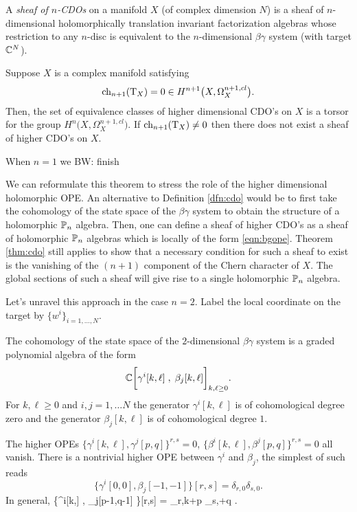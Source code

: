 \documentclass[11pt]{amsart}
\def\brian#1{{\textcolor{blue!65!red}{BW: {#1}}}}
\begin{document}
\begin{dfn}\label{dfn:cdo}
A {\em sheaf of $n$-CDOs} on a manifold $X$ (of complex dimension $N$) is a sheaf of $n$-dimensional holomorphically translation invariant factorization algebras whose restriction to any $n$-disc is equivalent to the $n$-dimensional $\beta\gamma$ system (with target $\mathbb C^N$). 
\end{dfn}

\begin{thm}\label{thm:cdo}
Suppose $X$ is a complex manifold satisfying 
\[
{\rm ch}_{n+1} ({\rm T}_X) = 0 \in H^{n+1} \big(X , \Omega^{n+1,cl}_X\big).
\]
Then, the set of equivalence classes of higher dimensional CDO's on $X$ is a torsor for the group $H^n \big(X , \Omega^{n+1, cl}_X\big)$. 
If ${\rm ch}_{n+1}({\rm T}_X) \ne 0$ then there does not exist a sheaf of higher CDO's on $X$. 
\end{thm}

\begin{rmk}
When $n=1$ we \cite{GGW} \brian{finish}
\end{rmk} 

We can reformulate this theorem to stress the role of the higher dimensional holomorphic OPE. 
An alternative to Definition \ref{dfn:cdo} would be to first take the cohomology of the state space of the $\beta\gamma$ system to obtain the structure of a holomorphic $\mathbb P_n$ algebra.
Then, one can define a sheaf of higher CDO's as a sheaf of holomorphic $\mathbb P_n$ algebras which is locally of the form \eqref{eqn:bgope}. 
Theorem \ref{thm:cdo} still applies to show that a necessary condition for such a sheaf to exist is the vanishing of the $(n+1)$ component of the Chern character of $X$. 
The global sections of such a sheaf will give rise to a single holomorphic $\mathbb P_n$ algebra. 


Let's unravel this approach in the case $n=2$. 
Label the local coordinate on the target by $\{w^i\}_{i=1,\ldots,N}$. 

The cohomology of the state space of the $2$-dimensional $\beta\gamma$ system is a graded polynomial algebra of the form
\[
\mathbb C\bigg[\gamma^i[k,\ell] \; , \; \beta_j [k,\ell] \bigg]_{k,\ell \geq 0} .
\]
For $k,\ell \geq 0$ and $i,j=1,\ldots N$ the generator $\gamma^i[k,\ell]$ is of cohomological degree zero and the generator $\beta_j[k,\ell]$ is of cohomological degree $1$.

The higher OPEs $\{\gamma^i[k,\ell], \gamma^j [p,q]\}^{r,s} = 0$, $\{\beta^i[k,\ell], \beta^j [p,q]\}^{r,s} = 0$ all vanish. 
There is a nontrivial higher OPE between $\gamma^i$ and $\beta_j$, the simplest of such reads
\[
\big\{\gamma^i[0,0] , \beta_j[-1,-1] \big\}[r,s] = \delta_{r,0} \delta_{s,0} .
\]
In general, 
\beqn\label{eqn:bgope}
\big\{\gamma^i[k,\ell] , \beta_j[p-1,q-1] \big\}[r,s] = \delta_{r,k+p} \delta_{s,\ell+q} .
\eeqn
\end{document}
